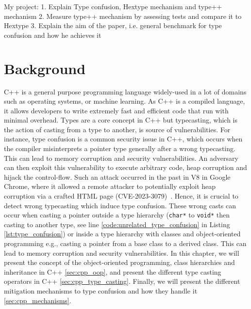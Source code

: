 \documentclass[a4paper,11pt,oneside]{report}
\begin{document}
My project: 
1. Explain Type confusion, Hextype mechanism and type++ mechanism
2. Measure type++ mechanism by assessing tests and compare it to Hextype
3. Explain the aim of the paper, i.e. general benchmark for type confusion and how he achieves it

\chapter{Background}

C++ is a general purpose 
programming language widely-used in a lot of domains
such as operating systems, or machine learning. As C++ is a compiled language, it
allows developers to write extremely fast and efficient code
that run with minimal overhead. Types are a core concept in C++
but typecasting, which is the action of casting from a type to another,
is source of vulnerabilities. For instance, type confusion is a common
security issue in C++, which occurs when the compiler misinterprets a pointer
type generally after a wrong typecasting. This can lead to memory corruption
and security vulnerabilities. An adversary can then exploit this vulnerability
to execute arbitrary code, heap corruption and hijack the control-flow.  Such an
attack occurred in the past in V8 in Google Chrome, where it allowed a remote
attacker to potentially exploit heap corruption via a crafted HTML page
(CVE-2023-3079)~\cite{nist}. Hence, it is crucial to detect wrong typecasting which induce
type confusion.  These wrong casts can occur when casting a pointer outside a
type hierarchy (\texttt{char*} to \texttt{void*} then casting to another type,
see line \ref{code:unrelated_type_confusion} in Listing
\autoref{lst:type_confusion}) or inside a type hierarchy with classes and
object-oriented programming e.g., casting a pointer from a base class to a
derived class. This can lead to memory corruption and security
vulnerabilities. In this chapter, we will present the concept of the object-oriented
programming, class hierarchies and inheritance in C++ \autoref{sec:cpp_oop}, and
present the different type casting operators in C++
\autoref{sec:cpp_type_casting}.  Finally, we will present the different
mitigation mechanisms to type confusion and how they handle it \autoref{sec:cpp_mechanisms}.
\end{document}
